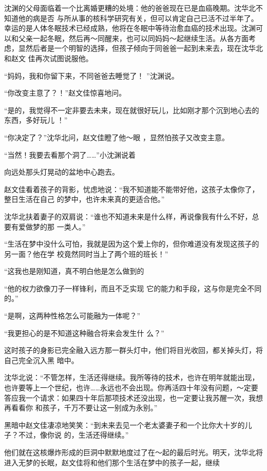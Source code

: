 \documentclass{article}
\begin{document}
沈渊的父母面临着一个比离婚更糟的处境：他的爸爸现在已是血癌晚期。沈华北不知道他的病是否
\newpage
与所从事的核科学研究有关，但可以肯定自己已活不过半年了。幸运的是人体冬眠技术已经成熟，他将在冬眠中等待治愈血癌的技术出现。沈渊可以和父亲一起冬眠，然后再～同醒来，也可以同妈妈～起继续生活。从各方面考虑，显然后者是一个明智的选择，但孩子倾向于同爸爸一起到未来去，现在沈华北和赵文
佳再次试图说服他。 

“妈妈，我和你留下来，不同爸爸去睡觉了！
”沈渊说。 


“你改变主意了？！”赵文佳惊喜地问。 

“是的，我觉得不一定非要去未来，现在就很好玩儿，比如刚才那个沉到地心去的东西，多好玩儿
！” 

“你决定了？”沈华北问，赵文佳瞪了他～眼
，显然怕孩子又改变主意。 

“当然！我要去看那个洞了……”小沈渊说着
\newpage

向远处那头灯晃动的盆地中心跑去。 

赵文佳看着孩子的背影，忧虑地说：“我不知道能不能带好他，这孩子太像你了，整日生活在自己
的梦中，也许未来真的更适合他。” 

沈华北扶着妻子的双肩说：“谁也不知道未来是什么样，再说像我有什么不好，总要有爱做梦的那
一类人。” 

“生活在梦中没什么可怕，我就是因为这个爱上你的，但你难道没有发现这孩子的另一面？他在学
校竟然同时当上了两个班的班长！” 

“这我也是刚知道，真不明白他是怎么做到的

“他的权力欲像刀子一样锋利，而且不乏实现
它的能力和手段，这与你是完全不同的。” 

“是啊，这两种性格怎么可能融为一体呢？”

\newpage

“我更担心的是不知道这种融合将来会发生什
么？” 

这时孩子的身影已完全融入远方那一群头灯中，他们将目光收回，都关掉头灯，将自己完全沉入黑
暗中。 

沈华北说：“不管怎样，生活还得继续。我所等待的技术，也许在明年就能出现，也许要等上一个世纪，也许……永远也不会出现。你再活四十年没有问题，～定要答应我一个请求：如果四十年后那项技术还没出现，也一定要让我苏醒一次，我想再看看你
和孩子，千万不要让这一别成为永别。” 

黑暗中赵文佳凄凉地笑笑：“到未来去见一个老太婆妻子和一个比你大十岁的儿子？不过，像你说
的，生活还得继续。” 

他们就在这核爆炸形成的巨洞中默默地度过了在～起的最后时光。明天，沈华北将进入无梦的长眠，赵文佳将和他们那个生活在梦中的孩子一起，继续
\newpage
\end{document}
